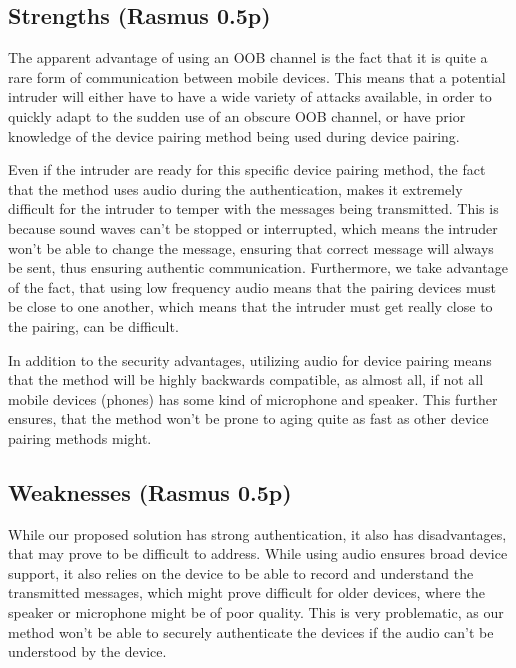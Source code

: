 \documentclass[12pt]{article}
\begin{document}
\newpage

\subsection{Strengths (Rasmus 0.5p)}
\label{sub:Strengths}

The apparent advantage of using an OOB channel is the fact that it is quite a rare form of communication between mobile devices. This means that a potential intruder will either have to have a wide variety of attacks available, in order to quickly adapt to the sudden use of an obscure OOB channel, or have prior knowledge of the device pairing method being used during device pairing.

Even if the intruder are ready for this specific device pairing method, the fact that the method uses audio during the authentication, makes it extremely difficult for the intruder to temper with the messages being transmitted. This is because sound waves can't be stopped or interrupted, which means the intruder won't be able to change the message, ensuring that correct message will always be sent, thus ensuring authentic communication. Furthermore, we take advantage of the fact, that using low frequency audio means that the pairing devices must be close to one another, which means that the intruder must get really close to the pairing, can be difficult.

In addition to the security advantages, utilizing audio for device pairing means that the method will be highly backwards compatible, as almost all, if not all mobile devices (phones) has some kind of microphone and speaker. This further ensures, that the method won't be prone to aging quite as fast as other device pairing methods might.


\subsection{Weaknesses (Rasmus 0.5p)}
\label{sub:Weaknesses}

While our proposed solution has strong authentication, it also has disadvantages, that may prove to be difficult to address. While using audio ensures broad device support, it also relies on the device to be able to record and understand the transmitted messages, which might prove difficult for older devices, where the speaker or microphone might be of poor quality. This is very problematic, as our method won't be able to securely authenticate the devices if the audio can't be understood by the device.
\end{document}

